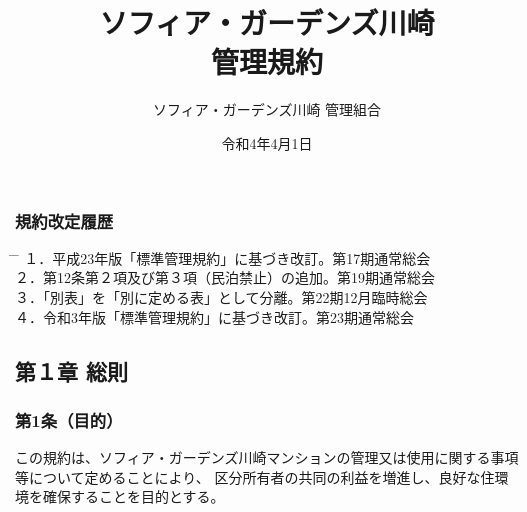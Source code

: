 \documentclass[12pt,uplatex,dvipdfmx]{jsarticle}
\title{ソフィア・ガーデンズ川崎\\管理規約}
\begin{document}
\date{令和4年4月1日}
\maketitle
\begin{center}
  \vspace{100mm}
  \author{\Large ソフィア・ガーデンズ川崎 管理組合}
\end{center}
\vspace{\baselineskip}
\vspace{\baselineskip}
  \subsubsection*{ 規約改定履歴 }
  \vspace{\baselineskip}
  \begin{tabbing}
    \hspace{5mm} \= \hspace{80mm} \= \hspace{100mm} \kill
    １．\>平成23年版「標準管理規約」に基づき改訂。\>第17期通常総会\\
    ２．\>第12条第２項及び第３項（民泊禁止）の追加。\>第19期通常総会\\
    ３．\>「別表」を「別に定める表」として分離。\>第22期12月臨時総会\\
    ４．\>令和3年版「標準管理規約」に基づき改訂。\>第23期通常総会\\
  \end{tabbing}
\clearpage
\tableofcontents
\clearpage
\addtocounter{page}{-3}
\pagestyle{plain}
\begin{center}
\subsection*{第１章 総則}
\end{center}
\subsubsection*{ 第1条（目的）}
この規約は、ソフィア・ガーデンズ川崎マンションの管理又は使用に関する事項等について定めることにより、
区分所有者の共同の利益を増進し、良好な住環境を確保することを目的とする。
\end{document}
